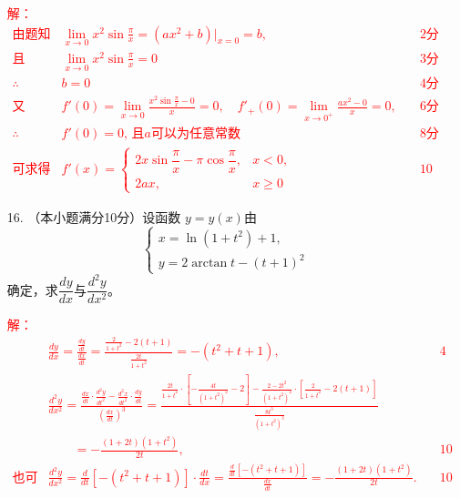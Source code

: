\documentclass[a4paper,12pt]{article}
\begin{document}
\begin{enumerate}
    \textcolor{red}{
    解：
    \begin{align*}
        \text{由题知} \quad& \lim_{x \to 0} x^2 \sin \frac{\pi}{x} = (a x^2 + b)|_{x=0} = b,  \quad & \text{2分}\\
        \text{且} \quad& \lim_{x \to 0} x^2 \sin \frac{\pi}{x} = 0 \quad & \text{3分} \\
        \therefore\quad& b = 0  \quad & \text{4分}\\
        \text{又} \quad& f'(0) = \lim_{x \to 0} \frac{x^2 \sin \frac{\pi}{x} - 0}{x} = 0, \quad f'_+(0) = \lim_{x \to 0^+} \frac{a x^2 - 0}{x} = 0,  \quad & \text{6分}\\
        \therefore \quad& f'(0) = 0 \text{, 且} a \text{可以为任意常数}  \quad & \text{8分} \\
        \text{可求得} \quad& f'(x) = \begin{cases}
                2x \sin{\dfrac{\pi}{x}} - \pi \cos{\dfrac{\pi}{x}}, & x < 0, \\
                2ax, & x \geq 0
            \end{cases} \quad & \text{10分}
    \end{align*}
    }

    \item[16.]（本小题满分10分）设函数 \( y=y(x) \)由
    \[
    \begin{cases}
        x=\ln{(1+t^2)}+1, \\
        y=2\arctan{t} - (t+1)^2
    \end{cases}
    \]
    确定，求\( \dfrac{dy}{dx} \)与\( \dfrac{d^2 y}{dx^2} \)。

    \textcolor{red}{
    解：
    \begin{align*}
        & \frac{dy}{dx} = \frac{\frac{dy}{dt}}{\frac{dx}{dt}} = \frac{\frac{2}{1+t^2} - 2(t+1)}{\frac{2t}{1+t^2}} = -(t^2 + t + 1),  \quad & \text{4分} \\
        & \frac{d^2 y}{dx^2} = \frac{\frac{dx}{dt} \cdot \frac{d^2 y}{dt^2} - \frac{d^2 x}{dt^2} \cdot \frac{dy}{dt}}{\left( \frac{dx}{dt} \right)^3} = \frac{\frac{2t}{1+t^2} \cdot \left[ -\frac{4t}{(1+t^2)^2} - 2 \right] - \frac{2 - 2t^2}{(1+t^2)^2} \cdot \left[ \frac{2}{1+t^2} - 2(t+1) \right]}{\frac{8t^3}{(1+t^2)^3}} \\
        &\quad \quad = -\frac{(1+2t)(1+t^2)}{2t},  \quad & \text{10分}\\
        \text{也可以直接} \quad & \frac{d^2 y}{dx^2} = \frac{d}{dt} \left[ -(t^2 + t + 1) \right] \cdot \frac{dt}{dx} = \frac{\frac{d}{dt} \left[ -(t^2 + t + 1) \right]}{\frac{dx}{dt}} = -\frac{(1+2t)(1+t^2)}{2t}.  \quad & \text{10分}
        \end{align*}
    }


\end{enumerate}
\end{document}

